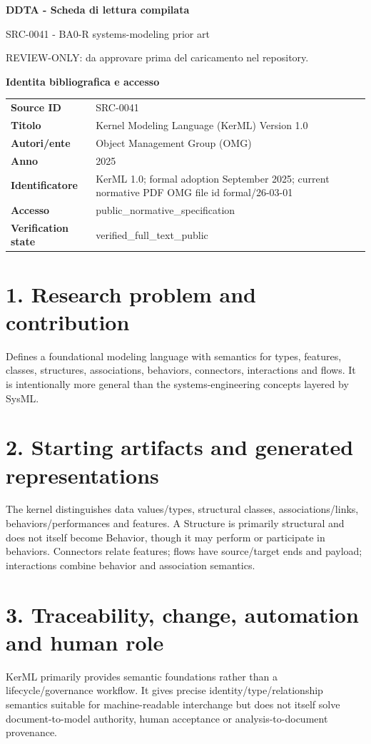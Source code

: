 \documentclass[10pt,a4paper]{article}
\newenvironment{factbox}[1]{\def\FrameCommand{\fcolorbox{ddtablue}{ddtagray}}\MakeFramed{\advance\hsize-2\width\FrameRestore}\noindent\textbf{#1}\par\smallskip}{\endMakeFramed}
\begin{document}
\begin{center}
{\LARGE\bfseries DDTA - Scheda di lettura compilata}\par
{\large SRC-0041 - BA0-R systems-modeling prior art}\par
{\small REVIEW-ONLY: da approvare prima del caricamento nel repository.}\par
\end{center}
\begin{factbox}{Identita bibliografica e accesso}
\begin{tabularx}{\linewidth}{>{\bfseries}p{3.4cm}X}
Source ID & SRC-0041\\
Titolo & Kernel Modeling Language (KerML) Version 1.0\\
Autori/ente & Object Management Group (OMG)\\
Anno & 2025\\
Identificatore & KerML 1.0; formal adoption September 2025; current normative PDF OMG file id formal/26-03-01\\
Accesso & public\_normative\_specification\\
Verification state & verified\_full\_text\_public\\
\end{tabularx}
\end{factbox}
\section{1. Research problem and contribution}
Defines a foundational modeling language with semantics for types, features, classes, structures, associations, behaviors, connectors, interactions and flows. It is intentionally more general than the systems-engineering concepts layered by SysML.
\section{2. Starting artifacts and generated representations}
The kernel distinguishes data values/types, structural classes, associations/links, behaviors/performances and features. A Structure is primarily structural and does not itself become Behavior, though it may perform or participate in behaviors. Connectors relate features; flows have source/target ends and payload; interactions combine behavior and association semantics.
\section{3. Traceability, change, automation and human role}
KerML primarily provides semantic foundations rather than a lifecycle/governance workflow. It gives precise identity/type/relationship semantics suitable for machine-readable interchange but does not itself solve document-to-model authority, human acceptance or analysis-to-document provenance.
\end{document}
